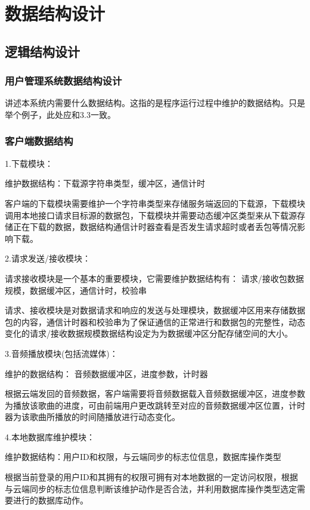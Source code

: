 \chapter{数据结构设计}
\section{逻辑结构设计}
\subsection{用户管理系统数据结构设计}
讲述本系统内需要什么数据结构。这指的是程序运行过程中维护的数据结构。只是举个例子，此处应和3.3一致。
\subsection{客户端数据结构}

1.下载模块：

维护数据结构：下载源字符串类型，缓冲区，通信计时

客户端的下载模块需要维护一个字符串类型来存储服务端返回的下载源，下载模块调用本地接口请求目标源的数据包，下载模块并需要动态缓冲区类型来从下载源存储正在下载的数据，数据结构通信计时器查看是否发生请求超时或者丢包等情况影响下载。



2.请求发送/接收模块：

请求接收模块是一个基本的重要模块，它需要维护数据结构有： 请求/接收包数据规模，数据缓冲区，通信计时，校验串

请求、接收模块是对数据请求和响应的发送与处理模块，数据缓冲区用来存储数据包的内容，通信计时器和校验串为了保证通信的正常进行和数据包的完整性，动态变化的请求/接收数据规模数据结构设定为为数据缓冲区分配存储空间的大小。

3.音频播放模块(包括流媒体)：

维护的数据结构： 音频数据缓冲区，进度参数，计时器

根据云端发回的音频数据，客户端需要将音频数据载入音频数据缓冲区，进度参数为播放该歌曲的进度，可由前端用户更改跳转至对应的音频数据缓冲区位置，计时器为该歌曲所播放的时间随播放进行动态变化。



4.本地数据库维护模块：

维护数据结构：用户ID和权限，与云端同步的标志位信息，数据库操作类型

根据当前登录的用户ID和其拥有的权限可拥有对本地数据的一定访问权限，根据与云端同步的标志位信息判断该维护动作是否合法，并利用数据库操作类型选定需要进行的数据库动作。

